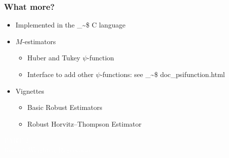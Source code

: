 \documentclass[framenumber,t]{beamer}
\makeatletter
\newcommand\code{\bgroup\@makeother\_\@makeother\~\@makeother\$\@makeother\^\@codex}
\def\@codex#1{{\normalfont\ttfamily\hyphenchar\font=-1 #1}\egroup}
\makeatother
\begin{document}
\begin{frame}
\frametitle{What more?}
    \begin{itemize}
    \setlength\itemsep{0.5em}
    \item Implemented in the \code{C} language
    \item \alert{$M$-estimators}
    \begin{itemize}
        \setlength\itemsep{0.25em}
        \item Huber and Tukey $\psi$-function
        \item Interface to add other $\psi$-functions: see
            \code{doc\_psifunction.html}
    \end{itemize}
    \item \alert{Vignettes}
    \begin{itemize}
        \setlength\itemsep{0.25em}
        \item Basic Robust Estimators
        \item Robust Horvitz--Thompson Estimator
    \end{itemize}
\end{itemize}
\end{frame}

\bgroup
{}
\begin{frame}[c,plain]{}
\begin{center}
    \textcolor{white}{\large PART 2}\\
    \vspace{1em}
    \textcolor{white}{\Huge Robust Weighted Regression}
\end{center}
\end{frame}
\egroup
\end{document}
